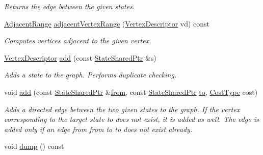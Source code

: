 \begin{DoxyCompactItemize}
\begin{DoxyCompactList}\small\item\em Returns the edge between the given states. \end{DoxyCompactList}\item 
\hyperlink{structStateGraph_ad8748ccee490f071b10c59dc63c1819a}{Adjacent\+Range} \hyperlink{structStateGraph_acbc2a157a61d09a6641f0203e1557c7c}{adjacent\+Vertex\+Range} (\hyperlink{structStateGraph_a95d7ea26b0d0d07d3488068a8e9be53c}{Vertex\+Descriptor} vd) const 
\begin{DoxyCompactList}\small\item\em Computes vertices adjacent to the given vertex. \end{DoxyCompactList}\item 
\hyperlink{structStateGraph_a95d7ea26b0d0d07d3488068a8e9be53c}{Vertex\+Descriptor} \hyperlink{structStateGraph_a5b0199d68e6b81d3ea19a1c422f5ceac}{add} (const \hyperlink{structStateGraph_a891fe4273003d7714f397f0d5dbae964}{State\+Shared\+Ptr} \&s)
\begin{DoxyCompactList}\small\item\em Adds a state to the graph. Performs duplicate checking. \end{DoxyCompactList}\item 
void \hyperlink{structStateGraph_ab9df38b207e42f1e068039696f33884b}{add} (const \hyperlink{structStateGraph_a891fe4273003d7714f397f0d5dbae964}{State\+Shared\+Ptr} \&\hyperlink{structStateGraph_adedd93d0dea76929eaec98633c535d26}{from}, const \hyperlink{structStateGraph_a891fe4273003d7714f397f0d5dbae964}{State\+Shared\+Ptr} \hyperlink{structStateGraph_a559e914bb1d10df20ab62be4ce667221}{to}, \hyperlink{structStateGraph_a4426dc0a4427fa1856af4d98bfe93aba}{Cost\+Type} cost)
\begin{DoxyCompactList}\small\item\em Adds a directed edge between the two given states to the graph. If the vertex corresponding to the target state {\ttfamily to} does not exist, it is added as well. The edge is added only if an edge from {\ttfamily from} to {\ttfamily to} does not exist already. \end{DoxyCompactList}\item 
void \hyperlink{structStateGraph_a30c24f0903d04ba21b63de1870176f51}{dump} () const \hypertarget{structStateGraph_a30c24f0903d04ba21b63de1870176f51}{}\label{structStateGraph_a30c24f0903d04ba21b63de1870176f51}


\end{DoxyCompactItemize}
